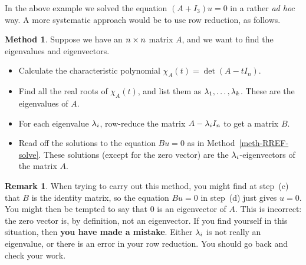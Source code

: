 \documentclass[reqno]{amsart}
\theoremstyle{definition}
\newtheorem{remark}[theorem]{Remark}
\newtheorem{method}[theorem]{Method}
\begin{document}
In the above example we solved the equation $(A+I_3)u=0$ in a rather
\emph{ad hoc} way.  A more systematic approach would be to use row
reduction, as follows.
\begin{method}\label{meth-eigen}
 Suppose we have an $n\times n$ matrix $A$, and we want to find the
 eigenvalues and eigenvectors.
 \begin{itemize}
  \item[(a)] Calculate the characteristic polynomial
   $\chi_A(t)=\det(A-t I_n)$.
  \item[(b)] Find all the real roots of $\chi_A(t)$, and list them as
   $\lambda_1,\dotsc,\lambda_k$.  These are the eigenvalues of $A$.
  \item[(c)] For each eigenvalue $\lambda_i$, row-reduce the matrix
   $A-\lambda_i I_n$ to get a matrix $B$.
  \item[(d)] Read off the solutions to the equation $Bu=0$ as in
   Method~\ref{meth-RREF-solve}.  These solutions (except for the zero
   vector) are the $\lambda_i$-eigenvectors of the matrix $A$.
 \end{itemize}
\end{method}

\begin{remark}\label{eg-eigenvalue-error}
 When trying to carry out this method, you might find at step~(c) that
 $B$ is the identity matrix, so the equation $Bu=0$ in step~(d) just
 gives $u=0$.  You might then be tempted to say that $0$ is an
 eigenvector of $A$.  This is incorrect: the zero vector is, by
 definition, not an eigenvector.  If you find yourself in this
 situation, then \textbf{you have made a mistake}.  Either $\lambda_i$ is
 not really an eigenvalue, or there is an error in your row
 reduction.  You should go back and check your work.
\end{remark}
\end{document}
